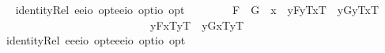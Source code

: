 \begin{isabellebody}
\isanewline
\ \isamarkupfalse%
\ identityRel{}{\isacharcolon}{\isacharcolon}{\isachardoublequoteopen}\ {\isacharparenleft}{\isacharparenleft}e{\isasymRightarrow}e{\isasymRightarrow}io{\isacharparenright}\ opt{\isacharparenright}{\isasymRightarrow}{\isacharparenleft}{\isacharparenleft}e{\isasymRightarrow}e{\isasymRightarrow}io{\isacharparenright}\ opt{\isacharparenright}{\isasymRightarrow}io\ opt{\isachardoublequoteclose}\ {\isacharparenleft}\ {\isachardoublequoteopen}\isactrlbold {\isacharequal}\ {}{}{\isacharparenright}\ \isanewline
\ \ \ \ {\isachardoublequoteopen}F{}\ \isactrlbold {\isacharequal}\ G{}\ {\isasymequiv}\ \isactrlbold {\isasymforall}x{}{\isachardot}{\isacharparenleft}\ \ {\isacharparenleft}\isactrlbold {\isasymlambda}y{\isachardot}{\isasymlparr}F{}{\isacharcomma}y\isactrlsup T{\isacharcomma}x{}\isactrlsup T{\isasymrparr}{\isacharparenright}\ \isactrlbold {\isacharequal}\ {\isacharparenleft}\isactrlbold {\isasymlambda}y{\isachardot}{\isasymlparr}G{}{\isacharcomma}y\isactrlsup T{\isacharcomma}x{}\isactrlsup T{\isasymrparr}{\isacharparenright}\isanewline
\ \ \ \ \ \ \ \ \ \ \ \ \ \ \ \ \ \ \ \ \ \ \ \ \ \ \isactrlbold {\isasymand}\ {\isacharparenleft}\isactrlbold {\isasymlambda}y{\isachardot}{\isasymlparr}F{}{\isacharcomma}x{}\isactrlsup T{\isacharcomma}y\isactrlsup T{\isasymrparr}{\isacharparenright}\ \isactrlbold {\isacharequal}\ {\isacharparenleft}\isactrlbold {\isasymlambda}y{\isachardot}{\isasymlparr}G{}{\isacharcomma}x{}\isactrlsup T{\isacharcomma}y\isactrlsup T{\isasymrparr}{\isacharparenright}{\isacharparenright}{\isachardoublequoteclose}\isanewline
\isanewline
\ \isamarkupfalse%
\ identityRel{}{\isacharcolon}{\isacharcolon}{\isachardoublequoteopen}\ {\isacharparenleft}{\isacharparenleft}e{\isasymRightarrow}e{\isasymRightarrow}e{\isasymRightarrow}io{\isacharparenright}\ opt{\isacharparenright}{\isasymRightarrow}{\isacharparenleft}{\isacharparenleft}e{\isasymRightarrow}e{\isasymRightarrow}e{\isasymRightarrow}io{\isacharparenright}\ opt{\isacharparenright}{\isasymRightarrow}io\ opt{\isachardoublequoteclose}\ {\isacharparenleft}\ {\isachardoublequoteopen}\isactrlbold {\isacharequal}\ {}{}{\isacharparenright}\ \isanewline

\end{isabellebody}
